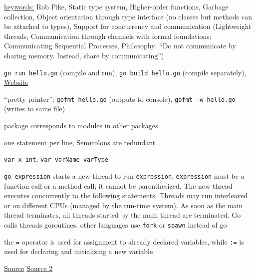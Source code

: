 \documentclass[landscape, a4paper]{article}
\begin{document}
\fontsize{3pt}{3pt}\selectfont

\begin{minipage}[t]{0.2\linewidth}
	  
	\begin{betterlist}
		\item \underline{keywords:} Rob Pike, Static type system, Higher-order functions, Garbage collection, Object orientation through type interface (no classes but methods can be attached to types), Support for concurrency and communication (Lightweight threads, Communication through channels with formal foundations: Communicating Sequential Processes, Philosophy: \enquote{Do not communicate by sharing memory. Instead, share by communicating})
	\end{betterlist}
	\begin{betterlist}
		\item \verb|go run hello.go| (compile and run), \verb|go build hello.go| (compile separately), \href{https://golang.org/}{Website}
		\item \alert{\enquote{pretty printer}:} \verb|gofmt hello.go| (outputs to console), \verb|gofmt -w hello.go| (writes to same file)
	\end{betterlist}
	\begin{betterlist}
		\item package corresponds to modules in other packages
		\item one statement per line, Semicolons are redundant
		\item \verb|var x int|, \verb|var varName varType|
		\item  \verb|go expression| starts a new thread to run \verb|expression|. \verb|expression| must be a function call or a method call; it cannot be parenthesized. The new thread executes concurrently to the following statements. Threads may run interleaved or on different CPUs (managed by the run-time system). As soon as the main thread terminates, all threads started by the main thread are terminated. Go calls threads \alert{goroutines}, other languages use \verb|fork| or \verb|spawn| instead of go
		\item the \verb|=| operator is used for assignment to already declared variables, while \verb|:=| is used for declaring and initializing a new variable
	\end{betterlist}
	 \href{https://wiki.haskell.org/Parallelism_vs._Concurrency}{Source} \href{https://go.dev/tour/concurrency/11}{Source 2}

\end{minipage}
\end{document}
